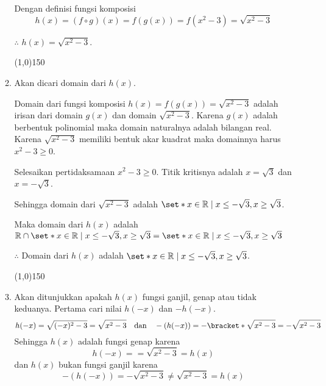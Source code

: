 \begin{enumerate}[leftmargin=*, label={\arabic*}.]
\begin{enumerate}[label={\alph*}.]
    Dengan definisi fungsi komposisi
    \[
    h(x)=(f \circ g)(x)=f(g(x))=f(x^{2}-3) = \sqrt{x^{2}-3}
    \]

    $\therefore$ $h(x) = \sqrt{x^{2}-3}$.
\begin{center}
    \line(1,0){150}
\end{center}
    \item Akan dicari domain dari $h(x)$.
    
    Domain dari fungsi komposisi $h(x)=f(g(x))=\sqrt{x^{2}-3}$ adalah irisan 
    dari domain $g(x)$ dan domain $\sqrt{x^{2}-3}$. Karena $g(x)$ adalah berbentuk 
    polinomial maka domain naturalnya adalah bilangan real. Karena $\sqrt{x^{2}-3}$ 
    memiliki bentuk akar kuadrat maka domainnya harus $x^{2}-3 \geq 0$.
    
    Selesaikan pertidaksamaan $x^{2}-3 \geq 0$. Titik kritisnya adalah $x=\sqrt{3}$ 
    dan $x=-\sqrt{3}$.

    \begin{center}
    \end{center}
    Sehingga domain dari $\sqrt{x^{2}-3}$ adalah 
    $\set*{x \in \mathbb{R} \mid x \leq -\sqrt{3}, x \geq \sqrt{3}}$.

    Maka domain dari $h(x)$ adalah $\mathbb{R} \cap 
    \set*{x \in \mathbb{R} \mid x \leq -\sqrt{3}, x \geq \sqrt{3}} 
    = \set*{x \in \mathbb{R} \mid x \leq -\sqrt{3}, x \geq \sqrt{3}}$

    $\therefore$ Domain dari $h(x)$ adalah 
    $\set*{x \in \mathbb{R} \mid x \leq -\sqrt{3}, x \geq \sqrt{3}}$. 
\begin{center}
    \line(1,0){150}
\end{center}
    \item Akan ditunjukkan apakah $h(x)$ fungsi ganjil, genap atau tidak keduanya.
    Pertama cari nilai $h(-x)$ dan $-h(-x)$.
    \[
    h(-x) = \sqrt{(-x)^{2}-3} = \sqrt{x^{2}- 3} \quad \text{dan} \quad 
    -(h(-x)) = -\bracket*{\sqrt{x^{2}- 3}} = -\sqrt{x^{2}- 3}
    \]   
    Sehingga $h(x)$ adalah fungsi genap karena
    \[
        h(-x) =  = \sqrt{x^{2}- 3} = h(x)
    \]
    dan $h(x)$ bukan fungsi ganjil karena 
    \[
        -(h(-x)) = -\sqrt{x^{2}- 3} \neq \sqrt{x^{2}- 3} = h(x)
    \]


\end{enumerate}
\end{enumerate}
